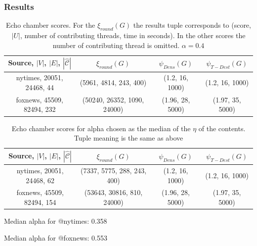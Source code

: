 \documentclass{beamer}
\begin{document}
\begin{frame}[c]
	\frametitle{Results}

	\tiny{
		\begin{table}[htpb]
			\centering
			\caption{Echo chamber scores. For the $\xi_{round}(G) $ the results tuple
				corresponds to (score, $|U|$, number of contributing threads, time in
				seconds). In the other scores the number of contributing thread
				is omitted. $\alpha = 0.4$}
			\begin{tabular}{c|c|c|c}
				\textbf{Source, $|V|$, $|E|$, $|\hat{\mathcal{C}}  |$} & $\xi_{round}(G) $          & $\psi_{Dens}(G)$ & $\psi_{T-Dest} (G)$ \\
				\hline
				nytimes, 20051, 24468, 44                                   &
                (5961, 4814, 243, 400)             & (1.2, 16, 1000)    &
                (1.2, 16, 1000)      \\
				foxnews, 45509, 82494, 232                                &
                (50240, 26352, 1090, 24000)          & (1.96, 28, 5000)    & (1.97,
                35, 5000)      \\
			\end{tabular}
		\end{table}
	}

	\tiny{
		\begin{table}[htpb]
			\centering
			\caption{Echo chamber scores for alpha chosen as the median of the
            $\eta$ of the contents. Tuple meaning is the same as above}
			\begin{tabular}{c|c|c|c}
				\textbf{Source, $|V|$, $|E|$, $|\hat{\mathcal{C}}  |$} & $\xi_{round}(G) $          & $\psi_{Dens}(G)$ & $\psi_{T-Dest} (G)$ \\
				\hline
				nytimes, 20051, 24468, 62                                   &
                (7337, 5775, 288, 243, 400)             & (1.2, 16, 1000)
                                                          & (1.2, 16, 1000)      \\
				foxnews, 45509, 82494, 154                                &
                (53643, 30816, 810, 24000)          & (1.96, 28, 5000)    & (1.97,
                35, 5000)      \\
			\end{tabular}
		\end{table}
	}

    \small{
    Median alpha for @nytimes: 0.358

    Median alpha for @foxnews: 0.553
    }
\end{frame}
\end{document}
